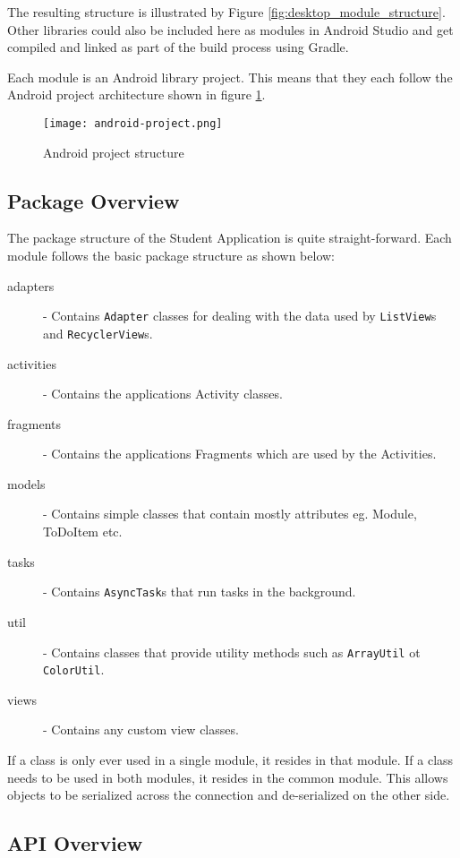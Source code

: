 The resulting structure is illustrated by Figure
\ref{fig:desktop_module_structure}. Other libraries could also be included here
as modules in Android Studio and get compiled and linked as part of the build
process using Gradle.

Each module is an Android library project. This means that they each follow the
Android project architecture shown in figure \ref{fig:android_project}.

\begin{figure}
    \centering
    \texttt{[image: android-project.png]}
    \caption{Android project structure}
    \label{fig:android_project}
\end{figure}

\subsection{Package Overview}

The package structure of the Student Application is quite straight-forward. Each
module follows the basic package structure as shown below:

\begin{description}
\item[adapters] - Contains \texttt{Adapter} classes for dealing with the data
    used by \texttt{ListView}s and \texttt{RecyclerView}s.
\item[activities] - Contains the applications Activity classes.
\item[fragments] - Contains the applications Fragments which are used by the
    Activities.
\item[models] - Contains simple classes that contain mostly attributes eg.
    Module, ToDoItem etc.
\item[tasks] - Contains \texttt{AsyncTask}s that run tasks in the background.
\item[util] - Contains classes that provide utility methods such as
    \texttt{ArrayUtil} ot \texttt{ColorUtil}.
\item[views] - Contains any custom view classes.
\end{description}

If a class is only ever used in a single module, it resides in that module. If
a class needs to be used in both modules, it resides in the common module. This
allows objects to be serialized across the connection and de-serialized on the
other side.

\subsection{API Overview}

